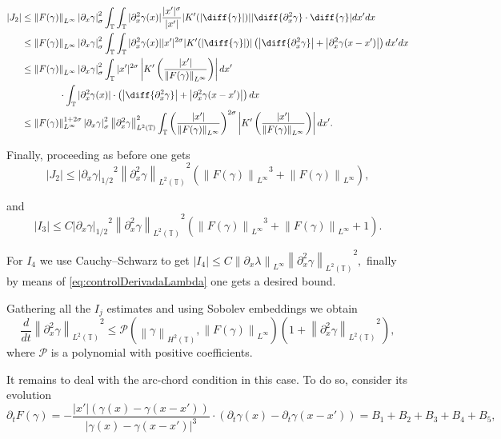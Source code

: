 \documentclass[a4paper]{amsart}
\theoremstyle{definition}
\newcommand{\T}{\ensuremath{\mathbb{T}}}
\newcommand{\SNa}[2][\gamma]{\ensuremath{\left|#2\right|_{#1}}}
\newcommand{\Np}[2][\infty]{\ensuremath{\left\|#2\right\|_{L^#1}}}
\newcommand{\Lp}[2][2]{\ensuremath{\left\|#2\right\|_{L^#1(\T)}}}
\newcommand{\Hd}[1]{\ensuremath{\left\|#1\right\|_{H^2(\T)}}}
\newcommand{\intT}{\ensuremath{\int_\T}}
\newcommand{\intTT}{\ensuremath{\int_\T\int_\T}}
\begin{document}
        \begin{align*}
            |J_2|&\leq \Np{F(\gamma)} \SNa[\sigma]{\partial_x\gamma }^2 \intTT |\partial_x^2\gamma(x)| \frac{|x'|^\sigma}{|x'|} |K'(|\diff{\gamma}|)|| \diff{\partial_x^2 \gamma}\cdot\diff{\gamma}| dx'dx\\
            &\leq \Np{F(\gamma)} \SNa[\sigma]{\partial_x\gamma }^2 \intTT |\partial_x^2\gamma(x)| |x'|^{2\sigma} |K'(|\diff{\gamma}|)| \left(\left|\diff{\partial_x^2\gamma}\right|+\left|\partial_x^2\gamma(x-x')\right|\right)dx'dx\\
            &\leq \Np{F(\gamma)} \SNa[\sigma]{\partial_x\gamma }^2 \intT  |x'|^{2\sigma} \left|K'\left(\frac{|x'|}{\Np{F(\gamma)}}\right)\right| dx'\\ &\qquad\qquad\cdot \intT |\partial_x^2\gamma(x)|\cdot\left(\left|\diff{\partial_x^2\gamma}\right|+\left|\partial_x^2\gamma(x-x')\right|\right)dx\\
            &\leq  \Np{F(\gamma)}^{1+2\sigma} \SNa[\sigma]{\partial_x\gamma }^2 \Lp{\partial^2_x \gamma}^2\intT  \left(\frac{|x'|}{\Np{F(\gamma)}}\right)^{2\sigma} \left|K'\left(\frac{|x'|}{\Np{F(\gamma)}}\right)\right| dx'.
        \end{align*}

        Finally, proceeding as before one gets $$|J_2|\leq \SNa[1/2]{\partial_x\gamma}^2 \Lp{\partial_x^2\gamma}^2 (\Np{F(\gamma)}^3+\Np{F(\gamma)}), $$

        and $$|I_3|\leq C \SNa[1/2]{\partial_x\gamma}^2 \Lp{\partial_x^2\gamma}^2 (\Np{F(\gamma)}^3+\Np{F(\gamma)}+1).$$      
                        
        For $I_4$ we use Cauchy--Schwarz to get $|I_4|\leq C \Np{\partial_x \lambda} \Lp{\partial_x^2 \gamma}^2,$ finally by means of \eqref{eq:controlDerivadaLambda} one gets a desired bound.
        
        Gathering all the $I_j$ estimates and using Sobolev embeddings we obtain 
        $$\frac{d}{dt} \Lp{\partial_x^2 \gamma}^2 \leq \mathcal{P}(\Hd{\gamma},\Np{F(\gamma)})\left(1+\Lp{\partial_x^2 \gamma}^2\right),$$ 
        where $\mathcal{P}$ is a polynomial with positive coefficients.

        It remains to deal with the arc-chord condition in this case. To do so, consider its evolution 
        $$\partial_tF(\gamma)=-\frac{|x'|(\gamma(x)-\gamma(x-x'))}{|\gamma(x)-\gamma(x-x')|^3}\cdot(\partial_t\gamma(x)-\partial_t\gamma(x-x'))=B_1+B_2+B_3+B_4+B_5,$$
\end{document}
